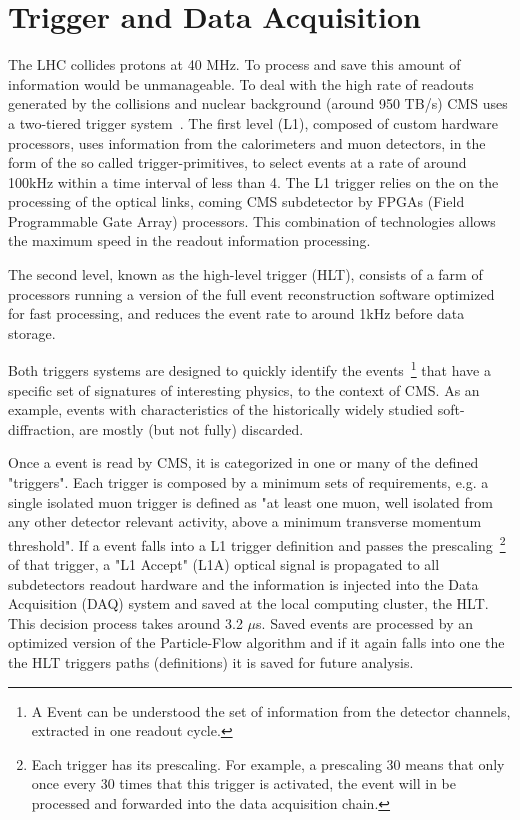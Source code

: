
\section{Trigger and Data Acquisition}

The LHC collides protons at 40 MHz. To process and save this amount of information would be unmanageable. To deal with the high rate of readouts generated by the collisions and nuclear background (around 950 TB/s) CMS uses a two-tiered trigger system~\cite{Khachatryan:2016bia}. The first level (L1), composed of custom hardware processors, uses information from the calorimeters and muon detectors, in the form of the so called trigger-primitives, to select events at a rate of around 100\unit{kHz} within a time interval of less than 4\mus. The L1 trigger relies on the on the processing of the optical links, coming CMS subdetector by FPGAs (Field Programmable Gate Array) processors. This combination of technologies allows the maximum speed in the readout information processing.

The second level, known as the high-level trigger (HLT), consists of a farm of processors running a version of the full event reconstruction software optimized for fast processing, and reduces the event rate to around 1\unit{kHz} before data storage.

Both triggers systems are designed to quickly identify the events~\footnote{A Event can be understood the set of information from the detector channels, extracted in one readout cycle.} that have a specific set of signatures of interesting physics, to the context of CMS. As an example, events with characteristics of the historically widely studied soft-diffraction, are mostly (but not fully) discarded. 

Once a event is read by CMS, it is categorized in one or many of the defined "triggers". Each trigger is composed by a minimum sets of requirements, e.g. a single isolated muon trigger is defined as "at least one muon, well isolated from any other detector relevant activity, above a minimum transverse momentum threshold". If a event falls into a L1 trigger definition and passes the prescaling~\footnote{Each trigger has its prescaling. For example, a prescaling 30 means that only once every 30 times that this trigger is activated, the event will in be processed and forwarded into the data acquisition chain.} of that trigger, a "L1 Accept" (L1A) optical signal is propagated to all subdetectors readout hardware and the information is injected into the Data Acquisition (DAQ) system and saved at the local computing cluster, the HLT. This decision process takes around 3.2 $\mu$s. Saved events are processed by an optimized version of the Particle-Flow algorithm and if it again falls into one the the HLT triggers paths (definitions) it is saved for future analysis.